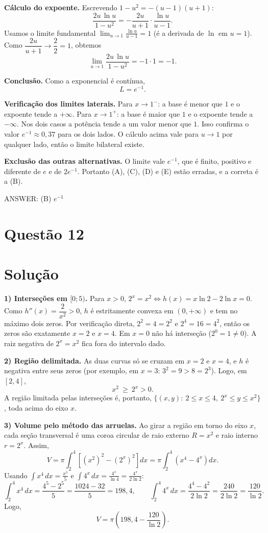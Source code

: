\documentclass{article}%
\begin{document}
\textbf{Cálculo do expoente.} Escrevendo $1-u^2=-(u-1)(u+1)$:
\[
\frac{2u\,\ln u}{1-u^2}=-\frac{2u}{u+1}\cdot\frac{\ln u}{u-1}.
\]
Usamos o limite fundamental $\displaystyle\lim_{u\to 1}\frac{\ln u}{u-1}=1$ (é a derivada de $\ln$ em $u=1$). Como $\dfrac{2u}{u+1}\to\dfrac{2}{2}=1$, obtemos
\[
\lim_{u\to 1}\frac{2u\,\ln u}{1-u^2}=-1\cdot 1=-1.
\]

\textbf{Conclusão.} Como a exponencial é contínua,
\[
L=e^{-1}.
\]

\textbf{Verificação dos limites laterais.} Para $x\to 1^-$: a base é menor que $1$ e o expoente tende a $+\infty$. Para $x\to 1^+$: a base é maior que $1$ e o expoente tende a $-\infty$. Nos dois casos a potência tende a um valor menor que $1$. Isso confirma o valor $e^{-1}\approx 0{,}37$ para os dois lados. O cálculo acima vale para $u\to 1$ por qualquer lado, então o limite bilateral existe.

\textbf{Exclusão das outras alternativas.} O limite vale $e^{-1}$, que é finito, positivo e diferente de $e$ e de $2e^{-1}$. Portanto (A), (C), (D) e (E) estão erradas, e a correta é a (B).

ANSWER: (B) $e^{-1}$%
\newpage%
\section*{Questão 12}

\section*{Solução}

\textbf{1) Interseções em $[0;5)$.} Para $x>0$, $2^x=x^2 \iff h(x)=x\ln 2-2\ln x=0$. Como $h''(x)=\dfrac{2}{x^2}>0$, $h$ é estritamente convexa em $(0,+\infty)$ e tem no máximo dois zeros. Por verificação direta, $2^2=4=2^2$ e $2^4=16=4^2$, então os zeros são exatamente $x=2$ e $x=4$. Em $x=0$ não há interseção ($2^0=1\neq 0$). A raiz negativa de $2^x=x^2$ fica fora do intervalo dado.

\textbf{2) Região delimitada.} As duas curvas só se cruzam em $x=2$ e $x=4$, e $h$ é negativa entre seus zeros (por exemplo, em $x=3$: $3^2=9>8=2^3$). Logo, em $[2,4]$,
\[
x^2\ \ge\ 2^x>0 .
\]
A região limitada pelas interseções é, portanto, $\{(x,y):\ 2\le x\le 4,\ 2^x\le y\le x^2\}$, toda acima do eixo $x$.

\textbf{3) Volume pelo método das arruelas.} Ao girar a região em torno do eixo $x$, cada seção transversal é uma coroa circular de raio externo $R=x^2$ e raio interno $r=2^x$. Assim,
\[
V=\pi\int_2^4\left[(x^2)^2-(2^x)^2\right]dx=\pi\int_2^4\left(x^4-4^x\right)dx .
\]
Usando $\displaystyle\int x^4\,dx=\frac{x^5}{5}$ e $\displaystyle\int 4^x\,dx=\frac{4^x}{\ln 4}=\frac{4^x}{2\ln 2}$:
\[
\int_2^4 x^4\,dx=\frac{4^5-2^5}{5}=\frac{1024-32}{5}=198{,}4,
\qquad
\int_2^4 4^x\,dx=\frac{4^4-4^2}{2\ln 2}=\frac{240}{2\ln 2}=\frac{120}{\ln 2}.
\]
Logo,
\[
V=\pi\left(198{,}4-\frac{120}{\ln 2}\right).
\]
\end{document}
